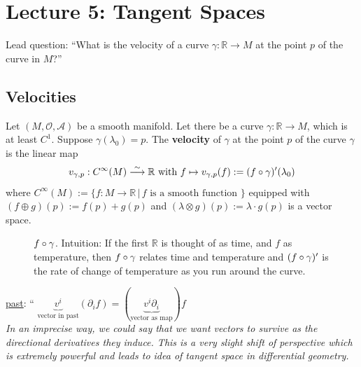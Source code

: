 \section{Lecture 5: Tangent Spaces}
Lead question: ``What is the velocity of a curve $\gamma : \mathbb{R} \to M$ at the point $p$ of the curve in $M$?''

\subsection{Velocities}
\begin{definition} Let $(M,\mathcal{O},\mathcal{A})$ be a smooth manifold. Let there be a curve $\gamma : \mathbb{R} \to M$, which is at least $C^1$. Suppose $\gamma(\lambda_0) =p$. The \textbf{velocity} of $\gamma$ at the point $p$ of the curve $\gamma$ is the linear map \\
\begin{equation}
v_{\gamma, p} : C^{\infty}(M) \stackrel{\sim}{\longrightarrow} \mathbb{R} \text{ with }
f \mapsto v_{\gamma,p}(f):= (f \circ \gamma)^{\prime}(\lambda_0)
\end{equation}
where $C^{\infty}(M) := \lbrace f: M \to \mathbb{R} \, | \, f \text{ is a smooth function } \rbrace$ equipped with \\
$(f \oplus g)(p) := f(p) + g(p)$ and $(\lambda \otimes g)(p) := \lambda \cdot g(p)$ is a vector space.
\end{definition}

\begin{figure}
\label{fig:L5_fAfterGamma}
  \centering
    \caption{$f \circ \gamma$. Intuition: If the first $\mathbb{R}$ is thought of as time, and $f$ as temperature, then $f \circ \gamma$ relates time and temperature and $(f \circ \gamma)^\prime$ is the rate of change of temperature as you run around the curve.}
\end{figure}

\underline{past}: `` $\underbrace{v^i}_{\text{vector in past}} (\partial_i f) = (\underbrace{v^i \partial_i}_{\text{vector as map}})f$ \\
\textit{In an imprecise way, we could say that we want vectors to survive as the directional derivatives they induce. This is a very slight shift of perspective which is extremely powerful and leads to idea of tangent space in differential geometry.}

